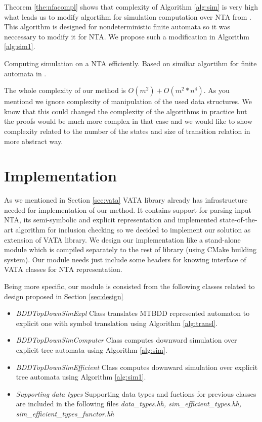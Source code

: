 \documentclass[a4paper, 12pt]{article}
\begin{document}
Theorem \ref{the:nfacompl} shows that complexity of Algorithm \ref{alg:sim} is very high what leads us
to modify algortihm for simulation computation over NTA from \cite{ilie:nta}.
This algorithm is designed for nondeterministic finite automata so it was neccessary to modify it for NTA.
We propose such a modification in Algorithm \ref{alg:sim1}.

\begin{algorithm}[h]
	
	 \caption{Computing simulation on a NTA efficiently. Based on similiar algortihm for finite automata in \cite{ilie:nfa}.}
\label{alg:sim1}
\end{algorithm}

The whole complexity of our method is $O(m^2)+O(m^2*n^4)$.
As you mentiond we ignore complexity of manipulation of the used data structures.
We know that this could changed the complexity of the algorithms in practice but the proofs would be much more complex in that case
and we would like to show complexity related to the number of the states and size of transition relation in more abstract way.

\section{Implementation}
\label{sec:impl}

As we mentioned in Section \ref{sec:vata} VATA library already has infrastructure needed for implementation of
our method.
It contains support for parsing input NTA, its semi-symbolic and explicit representation and implemented
state-of-the-art algorithm for inclusion checking so we decided to implement our solution as extension of VATA library.
We design our implementation like a stand-alone module which is compiled separately to the rest of library (using CMake building system).
Our module needs just include some headers for knowing interface of VATA classes for NTA representation.

Being more specific, our module is consisted from the following classes related to design proposed in Section \ref{sec:design}
\begin{itemize}
	\item \emph{BDDTopDownSimExpl} Class translates MTBDD represented automaton to explicit one with symbol translation using Algorithm \ref{alg:transl}.
	\item \emph{BDDTopDownSimComputer} Class computes downward simulation over explicit tree automata using Algorithm \ref{alg:sim}.
	\item \emph{BDDTopDownSimEfficient} Class computes downward simulation over explicit tree automata using Algorithm \ref{alg:sim1}.
	\item \emph{Supporting data types} Supporting data types and fuctions for previous classes are included in the following files \emph{data\_types.hh, sim\_efficient\_types.hh, sim\_efficient\_types\_functor.hh}
\end{itemize}
\end{document}
